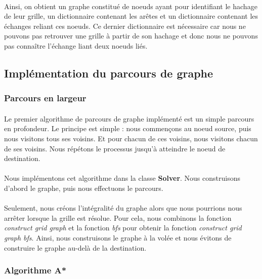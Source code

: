 \documentclass[12pt]{article}
\begin{document}
\paragraph{}
Ainsi, on obtient un graphe constitué de noeuds ayant pour identifiant le hachage de leur grille, un dictionnaire contenant les arêtes et un dictionnaire contenant les échanges reliant ces noeuds. Ce dernier dictionnaire est nécessaire car nous ne pouvons pas retrouver une grille à partir de son hachage et donc nous ne pouvons pas connaître l'échange liant deux noeuds liés.


\subsection{Implémentation du parcours de graphe}
\subsubsection{Parcours en largeur}

\paragraph{}
Le premier algorithme de parcours de graphe implémenté est un simple parcours en profondeur. Le principe est simple : nous commençons au noeud source, puis nous visitons tous ses voisins. Et pour chacun de ces voisins, nous visitons chacun de ses voisins. Nous répétons le processus jusqu'à atteindre le noeud de destination.

\paragraph{}
Nous implémentons cet algorithme dans la classe \textbf{Solver}. Nous construisons d'abord le graphe, puis nous effectuons le parcours.

\paragraph{}
Seulement, nous créons l'intégralité du graphe alors que nous pourrions nous arrêter lorsque la grille est résolue. Pour cela, nous combinons la fonction \textit{construct grid graph} et la fonction \textit{bfs} pour obtenir la fonction \textit{construct grid graph bfs}. Ainsi, nous construisons le graphe à la volée et nous évitons de construire le graphe au-delà de la destination.


\subsubsection{Algorithme A*}
\end{document}
